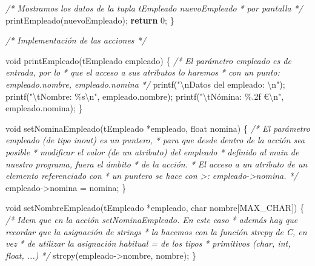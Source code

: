 \documentclass[
]{book}
\newenvironment{Shaded}{\begin{snugshade}}{\end{snugshade}}
\newcommand{\CommentTok}[1]{\textcolor[rgb]{0.56,0.35,0.01}{\textit{#1}}}
\newcommand{\ControlFlowTok}[1]{\textcolor[rgb]{0.13,0.29,0.53}{\textbf{#1}}}
\newcommand{\DataTypeTok}[1]{\textcolor[rgb]{0.13,0.29,0.53}{#1}}
\newcommand{\DecValTok}[1]{\textcolor[rgb]{0.00,0.00,0.81}{#1}}
\newcommand{\NormalTok}[1]{#1}
\newcommand{\SpecialCharTok}[1]{\textcolor[rgb]{0.00,0.00,0.00}{#1}}
\newcommand{\StringTok}[1]{\textcolor[rgb]{0.31,0.60,0.02}{#1}}
\begin{document}
\begin{Shaded}
\begin{Highlighting}[]
    \CommentTok{/* Mostramos los datos de la tupla tEmpleado nuevoEmpleado}
\CommentTok{     * por pantalla}
\CommentTok{     */}
\NormalTok{    printEmpleado(nuevoEmpleado);}
    \ControlFlowTok{return} \DecValTok{0}\NormalTok{;}
\NormalTok{\}}

\CommentTok{/* Implementación de las acciones */}

\DataTypeTok{void}\NormalTok{ printEmpleado(tEmpleado empleado) \{}
    \CommentTok{/* El parámetro empleado es de entrada, por lo}
\CommentTok{     * que el acceso a sus atributos lo haremos}
\CommentTok{     * con un punto: empleado.nombre, empleado.nomina}
\CommentTok{     */}
\NormalTok{    printf(}\StringTok{"}\SpecialCharTok{\textbackslash{}n}\StringTok{Datos del empleado: }\SpecialCharTok{\textbackslash{}n}\StringTok{"}\NormalTok{);}
\NormalTok{    printf(}\StringTok{"}\SpecialCharTok{\textbackslash{}t}\StringTok{Nombre: \%s}\SpecialCharTok{\textbackslash{}n}\StringTok{"}\NormalTok{, empleado.nombre);}
\NormalTok{    printf(}\StringTok{"}\SpecialCharTok{\textbackslash{}t}\StringTok{Nómina: \%.2f €}\SpecialCharTok{\textbackslash{}n}\StringTok{"}\NormalTok{, empleado.nomina);}
\NormalTok{\}}

\DataTypeTok{void}\NormalTok{ setNominaEmpleado(tEmpleado *empleado, }\DataTypeTok{float}\NormalTok{ nomina) \{}
    \CommentTok{/* El parámetro empleado (de tipo inout) es un puntero,}
\CommentTok{     * para que desde dentro de la acción sea posible}
\CommentTok{     * modificar el valor (de un atributo) del empleado}
\CommentTok{     * definido al main de nuestro programa, fuera el ámbito}
\CommentTok{     * de la acción. }
\CommentTok{     * El acceso a un atributo de un elemento referenciado con}
\CommentTok{     * un puntero se hace con \textquotesingle{}{-}\textgreater{}\textquotesingle{}: empleado{-}\textgreater{}nomina.}
\CommentTok{     */}
\NormalTok{    empleado{-}\textgreater{}nomina = nomina;}
\NormalTok{\}}

\DataTypeTok{void}\NormalTok{ setNombreEmpleado(tEmpleado *empleado, }\DataTypeTok{char}\NormalTok{ nombre[MAX\_CHAR]) \{}
    \CommentTok{/* Idem que en la acción setNominaEmpleado. En este caso}
\CommentTok{     * además hay que recordar que la asignación de strings}
\CommentTok{     * la hacemos con la función strcpy de C, en vez}
\CommentTok{     * de utilizar la asignación habitual \textquotesingle{}=\textquotesingle{} de los tipos}
\CommentTok{     * primitivos (char, int, float, ...)}
\CommentTok{     */}
\NormalTok{    strcpy(empleado{-}\textgreater{}nombre, nombre);}
\NormalTok{\}}
\end{Highlighting}
\end{Shaded}
\end{document}
